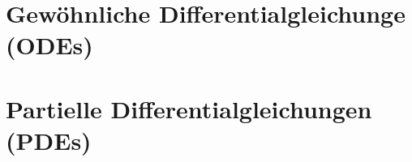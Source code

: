 \section{Gewöhnliche Differentialgleichunge (ODEs)}

\section{Partielle Differentialgleichungen (PDEs)}